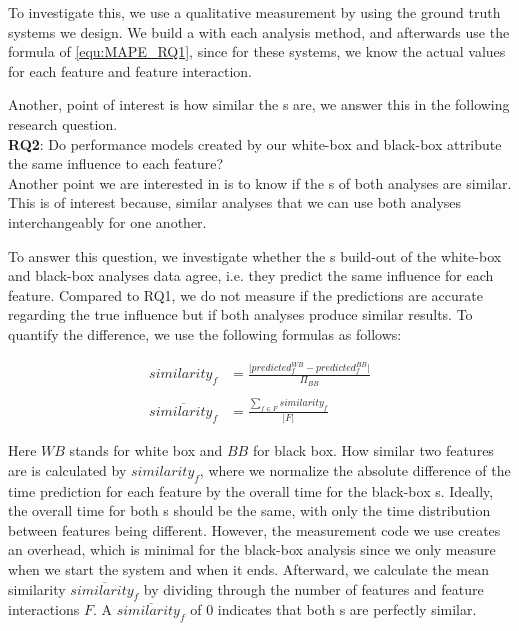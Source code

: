 To investigate this, we use a qualitative measurement by using the ground truth systems we design. 
We build a {\perfInfluenceModel} with each analysis method, and afterwards use the formula of \autoref{equ:MAPE_RQ1},
since for these systems, we know the actual values for each feature and feature interaction.

Another, point of interest is how similar the {\perfInfluenceModel}s are, we answer this in the following research question.\\

\noindent \textbf{RQ2}: Do performance models created by our white-box and black-box attribute the same influence to each feature?\\

Another point we are interested in is to know if the {\perfInfluenceModel}s of both analyses are similar.
This is of interest because, similar analyses that we can use both analyses interchangeably for one another.

To answer this question, we investigate whether the {\perfInfluenceModel}s build-out of the white-box and black-box analyses data agree, i.e.
they predict the same influence for each feature. 
Compared to RQ1, we do not measure if the predictions are accurate regarding the true influence but if both analyses produce similar results. 
To quantify the difference, we use the following formulas as follows:

\begin{align}
    similarity_f &= \frac{\lvert predicted^{WB}_{f} - predicted^{BB}_{f} \rvert}{\Pi_{BB}} \label{equ:APE_RQ1} \\ \nonumber \\
    \overline{similarity_f}  &=  \frac{\sum_{f \in F} similarity_f}{\lvert F \rvert} \label{equ:MAPE_RQ1}
\end{align}

Here $WB$ stands for white box and $BB$ for black box. How similar two features are is calculated by $similarity_f$, 
where we normalize the absolute difference of the time prediction for each feature by the overall time for the black-box {\perfInfluenceModel}s. 
Ideally, the overall time for both {\perfInfluenceModel}s should be the same, with only the time distribution between features being different. 
However, the measurement code we use creates an overhead, which is minimal for the black-box analysis since we only measure when we start the system and when it ends.
Afterward, we calculate the mean similarity $\overline{similarity_f}$ by dividing through the number of features and feature interactions $F$. 
A $\overline{similarity_f}$ of 0 indicates that both {\perfInfluenceModel}s are perfectly similar.

